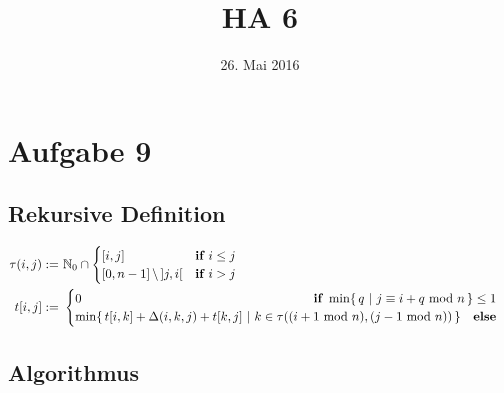 



\title{HA 6}
\date{26. Mai 2016}

\maketitle

\section*{Aufgabe 9}
\label{sec:Aufgabe 9}

\subsection{Rekursive Definition}
\label{sub:Rekursive Definition}

\begin{align*}
	\tau(i, j) := &\ \mathbb{N}_{0} \cap \begin{cases}
		[i, j] & \textbf{if } i \le j \\
		[0, n - 1]\, \backslash\, ]j, i[ & \textbf{if } i > j
	\end{cases} \\
	t[i, j] := &\ \begin{cases}
		0 \hfill \textbf{if } \min \{ \, q\ |\ j \equiv i + q \text{ mod } n \, \} \le 1 \\
		\min \{ \, t[i, k] + \Delta(i, k, j) + t[k, j]\ |\ k \in \tau((i + 1 \text{ mod } n), (j - 1 \text{ mod } n))\, \} \quad \textbf{else}
	\end{cases}
\end{align*}

\subsection{Algorithmus}
\label{sub:Algorithmus}

